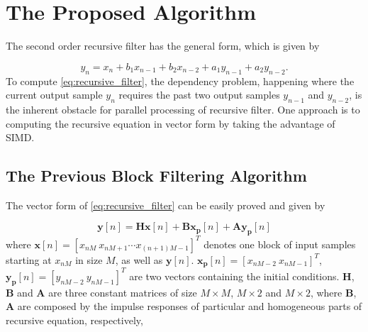\section{The Proposed Algorithm}
\label{sec:algorithm}

The second order recursive filter has the general form, which is given by

\begin{equation}
    \label{eq:recursive_filter}
    y_n = x_n + b_1x_{n-1} + b_2x_{n-2} + a_1y_{n-1} + a_2y_{n-2}.
\end{equation}
To compute \eqref{eq:recursive_filter}, the dependency problem, happening where the current output sample $y_n$
requires the past two output samples $y_{n-1}$ and $y_{n-2}$, is the inherent obstacle for parallel processing of recursive filter.
One approach is to computing the recursive equation in vector form by taking the advantage of SIMD. 


\subsection{The Previous Block Filtering Algorithm}

The vector form of \eqref{eq:recursive_filter} can be easily proved and given by

\begin{equation}
    \label{eq:block_filtering}
    \bm{y}[n] = \bm{H}\bm{x}[n] + \bm{B}\bm{x_p}[n] + \bm{A}\bm{y_p}[n] 
\end{equation}
where $\bm{x}[n] = \left[x_{nM}~x_{nM+1} \cdots x_{(n+1)M-1}\right]^T$ denotes one block of input samples starting at $x_{nM}$ in size $M$,
as well as $\bm{y}[n]$. $\bm{x_p}[n]=\left[x_{nM-2}~x_{nM-1}\right]^T$, $\bm{y_p}[n]=\left[y_{nM-2}~y_{nM-1}\right]^T$ are two vectors 
containing the initial conditions. 
$\bm{H}$, $\bm{B}$ and $\bm{A}$ are three constant matrices of size $M \times M$,
$M \times 2$ and $M \times 2$, 
where $\bm{B}$, $\bm{A}$ are composed by the impulse responses of particular and homogeneous parts of recursive equation,
respectively, 

